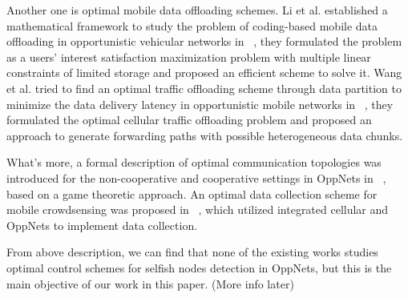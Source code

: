Another one is optimal mobile data offloading schemes. Li et al. established a mathematical framework to study the problem of coding-based mobile data offloading in opportunistic vehicular networks in ~\cite{DBLP:journals/tits/LiJWZ014}, they formulated the problem as a users' interest satisfaction maximization problem with multiple linear constraints of limited storage and proposed an efficient scheme to solve it. Wang et al. tried to find an optimal traffic offloading scheme through data partition to minimize the data delivery latency in opportunistic mobile networks in ~\cite{BLP:conf/icc/WangW18}, they formulated the optimal cellular traffic offloading problem and proposed an approach to generate forwarding paths with possible heterogeneous data chunks.

What's more, a formal description of optimal communication topologies was introduced for the non-cooperative and cooperative settings in OppNets in ~\cite{DBLP:conf/clima/BullingKP12}, based on a game theoretic approach. An optimal data collection scheme for mobile crowdsensing was proposed in ~\cite{DBLP:journals/access/MajeedZS20}, which utilized integrated cellular and OppNets to implement data collection. 

From above description, we can find that none of the existing works studies optimal control schemes for selfish nodes detection in OppNets, but this is the main objective of our work in this paper. (More info later)